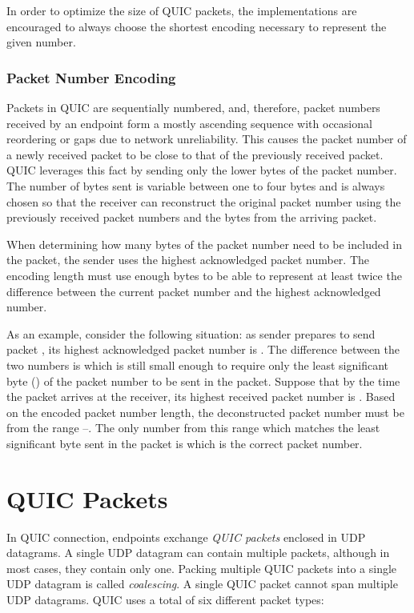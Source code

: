 In order to optimize the size of QUIC packets, the implementations are encouraged to always choose
the shortest encoding necessary to represent the given number.

\subsubsection{Packet Number Encoding}\label{sec:02-packet-number-encoding}

Packets in QUIC are sequentially numbered, and, therefore, packet numbers received by an endpoint
form a mostly ascending sequence with occasional reordering or gaps due to network unreliability.
This causes the packet number of a newly received packet to be close to that of the previously
received packet. QUIC leverages this fact by sending only the lower bytes of the packet number. The
number of bytes sent is variable between one to four bytes and is always chosen so that the receiver
can reconstruct the original packet number using the previously received packet numbers and the
bytes from the arriving packet.

When determining how many bytes of the packet number need to be included in the packet, the sender
uses the highest acknowledged packet number. The encoding length must use enough bytes to be able to
represent at least twice the difference between the current packet number and the highest
acknowledged number.

As an example, consider the following situation: as sender prepares to send packet ,
its highest acknowledged packet number is . The difference between the two numbers is
 which is still small enough to require only the least significant byte () of
the packet number to be sent in the packet. Suppose that by the time the packet arrives at the
receiver, its highest received packet number is . Based on the encoded packet number
length, the deconstructed packet number must be from the range --. The only
number from this range which matches the least significant byte sent in the packet is 
which is the correct packet number.

\section{QUIC Packets}

In QUIC connection, endpoints exchange \textit{QUIC packets} enclosed in UDP datagrams. A single UDP
datagram can contain multiple packets, although in most cases, they contain only one. Packing
multiple QUIC packets into a single UDP datagram is called \textit{coalescing}. A single QUIC packet
cannot span multiple UDP datagrams. QUIC uses a total of six different packet types:

